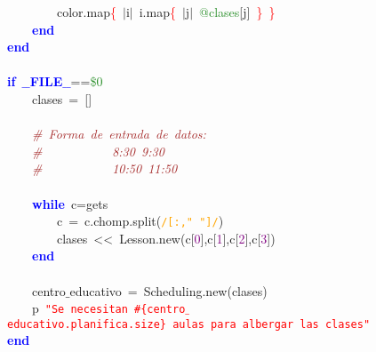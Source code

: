\mbox{}\ \ \ \ \ \ \ \ color\textcolor{BrickRed}{.}map\textcolor{Red}{\{}\ \textcolor{BrickRed}{$|$}i\textcolor{BrickRed}{$|$}\ i\textcolor{BrickRed}{.}map\textcolor{Red}{\{}\ \textcolor{BrickRed}{$|$}j\textcolor{BrickRed}{$|$}\ \textcolor{ForestGreen}{@clases}\textcolor{BrickRed}{[}j\textcolor{BrickRed}{]}\ \textcolor{Red}{\}}\ \textcolor{Red}{\}}\ \ \ \ \ \ \  \\
\mbox{}\ \ \ \ \textbf{\textcolor{Blue}{end}} \\
\mbox{}\textbf{\textcolor{Blue}{end}} \\
\mbox{} \\
\mbox{}\textbf{\textcolor{Blue}{if}}\ \textbf{\textcolor{Blue}{$\_$$\_$FILE$\_$$\_$}}\textcolor{BrickRed}{==}\textcolor{ForestGreen}{\$0} \\
\mbox{}\ \ \ \ clases\ \textcolor{BrickRed}{=}\ \textcolor{BrickRed}{[]} \\
\mbox{}\ \ \ \  \\
\mbox{}\ \ \ \ \textit{\textcolor{Brown}{\#\ Forma\ de\ entrada\ de\ datos:\ }} \\
\mbox{}\ \ \ \ \textit{\textcolor{Brown}{\#\ \ \ \ \ \ \ \ \ \ \ 8:30\ 9:30}} \\
\mbox{}\ \ \ \ \textit{\textcolor{Brown}{\#\ \ \ \ \ \ \ \ \ \ \ 10:50\ 11:50\ \ \ \ \ \ \ }} \\
\mbox{} \\
\mbox{}\ \ \ \ \textbf{\textcolor{Blue}{while}}\ c\textcolor{BrickRed}{=}gets \\
\mbox{}\ \ \ \ \ \ \ \ c\ \textcolor{BrickRed}{=}\ c\textcolor{BrickRed}{.}chomp\textcolor{BrickRed}{.}split\textcolor{BrickRed}{(}\texttt{\textcolor{Orange}{/[:,"{}\ "{}]/}}\textcolor{BrickRed}{)} \\
\mbox{}\ \ \ \ \ \ \ \ clases\ \textcolor{BrickRed}{\textless{}\textless{}}\ Lesson\textcolor{BrickRed}{.}new\textcolor{BrickRed}{(}c\textcolor{BrickRed}{[}\textcolor{Purple}{0}\textcolor{BrickRed}{],}c\textcolor{BrickRed}{[}\textcolor{Purple}{1}\textcolor{BrickRed}{],}c\textcolor{BrickRed}{[}\textcolor{Purple}{2}\textcolor{BrickRed}{],}c\textcolor{BrickRed}{[}\textcolor{Purple}{3}\textcolor{BrickRed}{])} \\
\mbox{}\ \ \ \ \textbf{\textcolor{Blue}{end}} \\
\mbox{}\ \ \ \  \\
\mbox{}\ \ \ \ centro$\_$educativo\ \textcolor{BrickRed}{=}\ Scheduling\textcolor{BrickRed}{.}new\textcolor{BrickRed}{(}clases\textcolor{BrickRed}{)} \\
\mbox{}\ \ \ \ p\ \texttt{\textcolor{Red}{"{}Se\ necesitan\ \#\{centro$\_$educativo.planifica.size\}\ aulas\ para\ albergar\ las\ clases"{}}} \\
\mbox{}\textbf{\textcolor{Blue}{end}}
